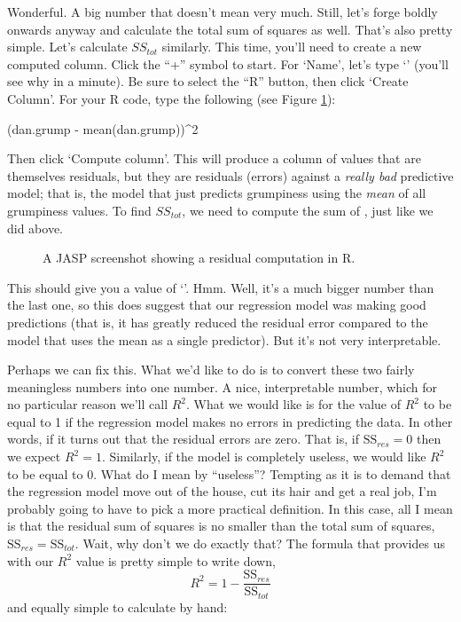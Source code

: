 Wonderful. A big number that doesn't mean very much. Still, let's forge boldly onwards anyway and calculate the total sum of squares as well. That's also pretty simple. Let's calculate $SS_{tot}$ similarly.  This time, you'll need to create a new computed column.  Click the ``+'' symbol to start. For `Name', let's type `' (you'll see why in a minute). Be sure to select the ``R'' button, then click `Create Column'. For your R code, type the following (see Figure \ref{fig:resid}):

\begin{rblock}
  (dan.grump - mean(dan.grump))^2
\end{rblock}

Then click `Compute column'.  This will produce a column of values that are themselves residuals, but they are residuals (errors) against a \emph{really bad} predictive model; that is, the model that just predicts grumpiness using the \emph{mean} of all grumpiness values.  To find $SS_{tot}$, we need to compute the sum of , just like we did above.
\noindent

\begin{figure}[!htb]
\begin{center}
\caption{A JASP screenshot showing a residual computation in R.}
\HR
\label{fig:resid}
\end{center}
\end{figure}

This should give you a value of `'. Hmm. Well, it's a much bigger number than the last one, so this does suggest that our regression model was making good predictions (that is, it has greatly reduced the residual error compared to the model that uses the mean as a single predictor). But it's not very interpretable. 

Perhaps we can fix this. What we'd like to do is to convert these two fairly meaningless numbers into one number. A nice, interpretable number, which for no particular reason we'll call $R^2$. What we would like is for the value of $R^2$ to be equal to 1 if the regression model makes no errors in predicting the data. In other words, if it turns out that the residual errors are zero. That is, if $\mbox{SS}_{res} = 0$ then we expect $R^2 = 1$. Similarly, if the model is completely useless, we would like $R^2$ to be equal to 0. What do I mean by ``useless''? Tempting as it is to demand that the regression model move out of the house, cut its hair and get a real job, I'm probably going to have to pick a more practical definition. In this case, all I mean is that the residual sum of squares is no smaller than the total sum of squares, $\mbox{SS}_{res} = \mbox{SS}_{tot}$. Wait, why don't we do exactly that? The formula that provides us with our $R^2$ value is pretty simple to write down,
$$
R^2 = 1 - \frac{\mbox{SS}_{res}}{\mbox{SS}_{tot}}
$$
and equally simple to calculate by hand: 

